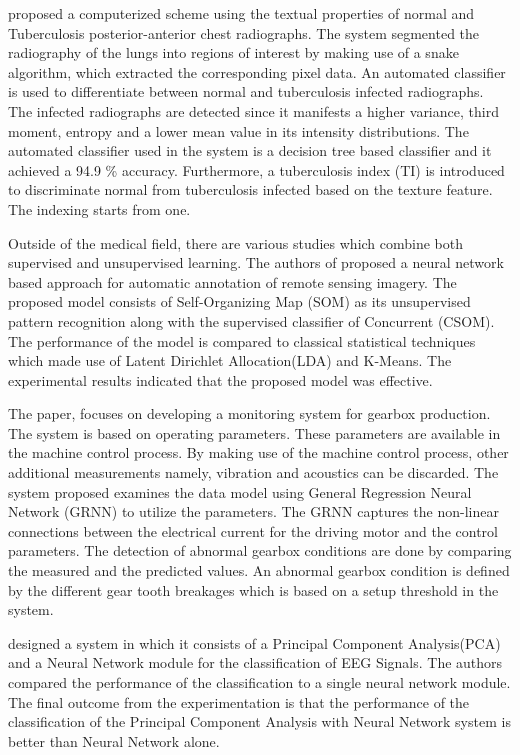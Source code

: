 \documentclass[11pt]{article}
\begin{document}
	\cite{tan2012computer} proposed a computerized scheme using the textual properties of normal and Tuberculosis posterior-anterior chest radiographs. The system segmented the radiography of the lungs into regions of interest by making use of a snake algorithm, which extracted the corresponding pixel data. An automated classifier is used to differentiate between normal and tuberculosis infected radiographs. The infected radiographs are detected since it manifests a higher variance, third moment, entropy and a lower mean value in its intensity distributions. The automated classifier used in the system is a decision tree based classifier and it achieved a 94.9 \% accuracy. Furthermore, a tuberculosis index (TI) is introduced to discriminate normal from tuberculosis infected based on the texture feature. The indexing starts from one.
	
	Outside of the medical field, there are various studies which combine both supervised and unsupervised learning. The authors of \cite{neagoe_new_2014} proposed a neural network based approach for automatic annotation of remote sensing imagery. The proposed model consists of Self-Organizing Map (SOM) as its unsupervised pattern recognition along with the supervised classifier of Concurrent (CSOM). The performance of the model is compared to classical statistical techniques which made use of Latent Dirichlet Allocation(LDA) and K-Means. The experimental results indicated that the proposed model was effective.
	
	The paper, \cite{Baqqar2012} focuses on developing a monitoring system for gearbox production. The system is based on operating parameters. These parameters are available in the machine control process. By making use of the machine control process, other additional measurements namely, vibration and acoustics can be discarded. The system proposed examines the data model using General Regression Neural Network (GRNN) to utilize the parameters. The GRNN captures the non-linear connections between the electrical current for the driving motor and the control parameters. The detection of abnormal gearbox conditions are done by comparing the measured and the predicted values. An abnormal gearbox condition is defined by the different gear tooth breakages which is based on a setup threshold in the system.
	
	\cite{kottaimalai_eeg_2013} designed a system in which it consists of a Principal Component Analysis(PCA) and a Neural Network module for the classification of EEG Signals. The authors compared the performance of the classification to a single neural network module. The final outcome from the experimentation is that the performance of the classification of the Principal Component Analysis with Neural Network system is better than Neural Network alone.  
	
\end{document}
